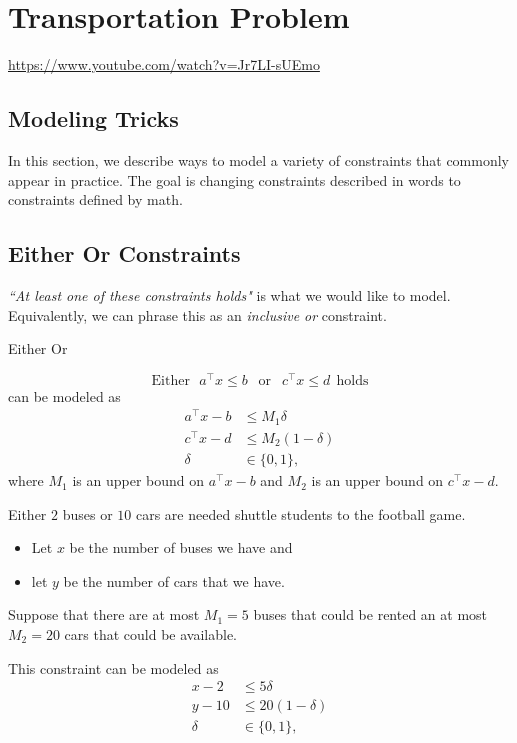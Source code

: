 \documentclass[../open-optimization/open-optimization.tex]{subfiles}
\begin{document}
\section{Transportation Problem}
\url{https://www.youtube.com/watch?v=Jr7LI-sUEmo}
\subsection{Modeling Tricks}
In this section, we describe ways to model a variety of constraints that commonly appear in practice.  The goal is changing constraints described in words to constraints defined by math.
\subsection{Either Or Constraints}
\emph{``At least one of these constraints holds"} is what we would like to model.  Equivalently, we can phrase this as an \emph{inclusive or} constraint.  
\begin{general}{Either Or}{}{}

\begin{equation}
\text{Either} \ \ \ a^\top x \leq b\ \  \text{  or  } \ \  c^\top x \leq d \ \ \text{holds} 
\end{equation}
can be modeled as 
\begin{equation}
\begin{split}
a^\top x - b &\leq M_1 \delta\\
c^\top x - d &\leq M_2 (1-\delta)\\
\delta &\in \{0,1\},
\end{split}
\end{equation}
where $M_1$ is an upper bound on $a^\top x - b$ and $M_2$ is an upper bound on $c^\top x - d$.
\end{general}

\begin{example}{}{}
Either $2$ buses or $10$ cars are needed shuttle students to the football game.  
\begin{itemize}
\item Let $x$ be the number of buses we have and 
\item let $y$ be the number of cars that we have.  
\end{itemize}
Suppose that there are at most $M_1 = 5$ buses that could be rented an at most $M_2 = 20$ cars that could be available.

This constraint can be modeled as 
\begin{equation}
\begin{split}
x - 2 &\leq 5\delta\\
y - 10 &\leq 20 (1-\delta)\\
\delta &\in \{0,1\},
\end{split}
\end{equation}
\end{example}
\end{document}
